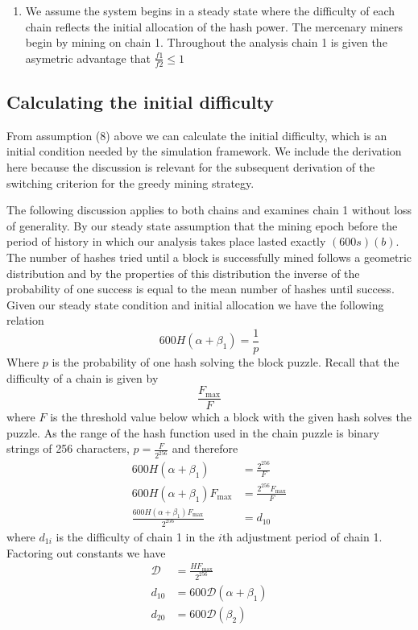 \documentclass[10pt, preprint]{aastex}
\begin{document}
\begin{enumerate}
\item
We assume the system begins in a steady state where the difficulty of each chain reflects the initial allocation of the hash power.  The mercenary miners begin by mining on chain 1.  Throughout the analysis chain 1 is given the asymetric advantage that $\frac{f1}{f2} \leq 1$
\end{enumerate}

\subsection{Calculating the initial difficulty}

From assumption (8) above we can calculate the initial difficulty, which is an initial condition needed by the simulation framework.  We include the derivation here because the discussion is relevant for the subsequent derivation of the switching criterion for the greedy mining strategy.  

The following discussion applies to both chains and examines chain 1 without loss of generality.  By our steady state assumption that the mining epoch before the period of history in which our analysis takes place lasted exactly $(600 s)(b)$.  The number of hashes tried until a block is successfully mined follows a geometric distribution and by the properties of this distribution the inverse of the probability of one success is equal to the mean number of hashes until success.  Given our steady state condition and initial allocation we have the following relation
$$
600 H(\alpha+ \beta_1) = \frac{1}{p}
$$
Where $p$ is the probability of one hash solving the block puzzle.
Recall that the difficulty of a chain is given by
$$
\frac{F_{\text{max}}}{F}
$$
where $F$ is the threshold value below which a block with the given hash solves the puzzle.  As the range of the hash function used in the chain puzzle is binary strings of 256 characters, $p = \frac{F}{2^{256}}$ and therefore
\begin{align*}
600 H(\alpha + \beta_1) &= \frac{2^{256}}{F}\\
600 H(\alpha + \beta_1)F_{\text{max}} &= \frac{2^{256}F_{\text{max}}}{F}\\
\frac{600 H(\alpha + \beta_1)F_{\text{max}} }{2^{256}} &= d_{10}
\end{align*}
where $d_{1i}$ is the difficulty of chain 1 in the $i$th adjustment period of chain 1.  Factoring out constants we have
\begin{align*}
\mathcal{D} &= \frac{HF_{\text{max}} }{2^{256}}\\
d_{10} &= 600\mathcal{D} (\alpha + \beta_1)\\
d_{20} &= 600\mathcal{D} (\beta_2)\\
\end{align*}
\end{document}
